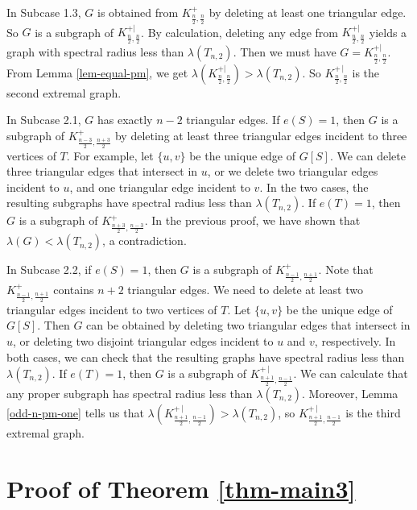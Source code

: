 \documentclass[11pt]{article}
\begin{document}
In Subcase 1.3, 
$G$ is obtained from $K_{\frac{n}{2} , \frac{n}{2}}^+$ by 
deleting at least one triangular edge. 
So $G$ is a subgraph of $K_{\frac{n}{2} ,  \frac{n}{2} }^{+|}$. 
 By calculation,  deleting any edge from $K_{\frac{n}{2} ,  \frac{n}{2} }^{+|}$ yields a graph with spectral radius 
 less than $\lambda (T_{n,2})$. 
 Then we must have $G=K_{\frac{n}{2} ,  \frac{n}{2} }^{+|}$. 
 From Lemma \ref{lem-equal-pm}, 
we get 
$\lambda (K_{\frac{n}{2} ,  \frac{n}{2} }^{+|}) > \lambda (T_{n,2})$. So $K_{\frac{n}{2} ,  \frac{n}{2} }^{+\,|}$ is the second  extremal graph. 

\medskip 
In Subcase 2.1, $G$ has exactly $n-2$ triangular edges. 
If $e(S)=1$, then $G$ is 
a subgraph of $K_{\frac{n-3}{2} , \frac{n+3}{2} }^+$ 
by deleting at least three triangular edges incident to 
three vertices of $T$. 
For example, let $\{u,v\}$ be the unique edge of $G[S]$. 
 We can delete three triangular edges that intersect in $u$, 
or we delete two triangular edges incident to $u$, 
and one triangular edge incident to $v$. 
In the two cases, 
the resulting subgraphs have spectral radius less than 
$\lambda (T_{n,2})$. 
If $e(T)=1$, then $G$ is a subgraph of 
$K_{\frac{n+3}{2} , \frac{n-3}{2} }^+$. In the previous proof, 
we have shown that $ \lambda (G)< \lambda (T_{n,2})$, a contradiction. 


In Subcase 2.2, 
if $e(S)=1$, then $G$ is a subgraph of $K_{\frac{n-1}{2} , \frac{n+1}{2} }^+$. 
Note that $K_{\frac{n-1}{2} , \frac{n+1}{2} }^+$ contains 
$n+2$ triangular edges. We need to delete at least 
two triangular edges incident to two vertices of $T$. 
Let $\{u,v\}$ be the unique edge 
of $G[S]$. Then 
$G$ can be obtained by deleting two triangular edges 
that intersect in $u$, or 
deleting two disjoint triangular edges incident to $u$ and $v$, 
respectively. 
 In both cases, 
 we can check that the resulting graphs have spectral radius less than $\lambda (T_{n,2})$.  
If $e(T)=1$, then $G$ is a subgraph of 
$K_{\frac{n+1}{2} , \frac{n-1}{2} }^{+\,|}$. 
We can calculate that any proper subgraph has spectral radius less than $\lambda (T_{n,2})$. 
Moreover, 
 Lemma \ref{odd-n-pm-one} tells us that 
$\lambda (K_{\frac{n+1}{2} , \frac{n-1}{2} }^{+\,|}) 
> \lambda (T_{n,2})$, so $K_{\frac{n+1}{2} , \frac{n-1}{2} }^{+\,|}$  is the third extremal graph. 





\section{Proof of Theorem \ref{thm-main3}}
\end{document}
